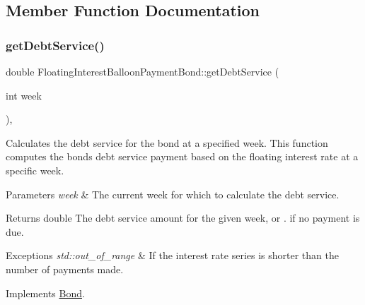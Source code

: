 \subsection{Member Function Documentation}
\mbox{\label{classFloatingInterestBalloonPaymentBond_a0009a0b12e0ebeb15952561513ddc901}} 
\subsubsection{\texorpdfstring{get\+Debt\+Service()}{getDebtService()}}
{\footnotesize\ttfamily double Floating\+Interest\+Balloon\+Payment\+Bond\+::get\+Debt\+Service (\begin{DoxyParamCaption}\item[{int}]{week }\end{DoxyParamCaption})\hspace{0.3cm}{\ttfamily [override]}, {\ttfamily [virtual]}}



Calculates the debt service for the bond at a specified week. This function computes the bond\textquotesingle{}s debt service payment based on the floating interest rate at a specific week. 


\begin{DoxyParams}{Parameters}
{\em week} & The current week for which to calculate the debt service.\\
\hline
\end{DoxyParams}
\begin{DoxyReturn}{Returns}
double The debt service amount for the given week, or {.} if no payment is due.
\end{DoxyReturn}

\begin{DoxyExceptions}{Exceptions}
{\em std\+::out\+\_\+of\+\_\+range} & If the interest rate series is shorter than the number of payments made. \\
\hline
\end{DoxyExceptions}


Implements \mbox{\hyperlink{classBond_a98d8ecaf4b36319674ebd220598996bc}{Bond}}.

\mbox{\label{classFloatingInterestBalloonPaymentBond_a90205e26e09eef1227f8c0671ca4fce2}} 
